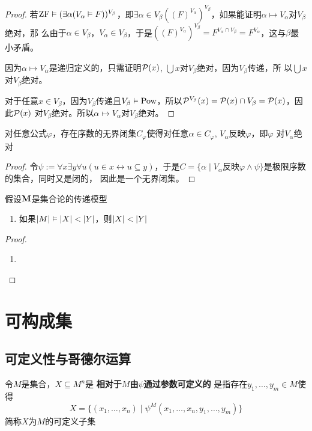 \documentclass[11pt]{article}
\begin{document}
\begin{proof}
若\(\operatorname{ZF}\vDash(\exists\alpha(V_\alpha\vDash F))^{V_\beta}\)，即\(\exists\alpha\in V_\beta((F)^{V_\alpha})^{V_\beta}\)，如果能证明\(\alpha\mapsto V_\alpha\)对\(V_\beta\)绝对，那
么由于\(\alpha\in V_\beta\)，\(V_\alpha\in V_\beta\)，于是\(((F)^{V_\alpha})^{V_\beta}=F^{V_\alpha\cap V_\beta}=F^{V_\alpha}\)，这与\(\beta\)最小矛盾。

因为\(\alpha\mapsto V_\alpha\)是递归定义的，只需证明\(\mathcal{P}(x)\), \(\bigcup x\)对\(V_\beta\)绝对，因为\(V_\beta\)传递，所
以\(\bigcup x\)对\(V_\beta\)绝对。

对于任意\(x\in V_\beta\)，因为\(V_\beta\)传递且\(V_\beta\vDash\operatorname{Pow}\)，所以\(\mathcal{P}^{V_\beta}(x)=\mathcal{P}(x)\cap V_\beta=\mathcal{P}(x)\)，因此\(\mathcal{P}(x)\)
对\(V_\beta\)绝对。所以\(\alpha\mapsto V_\alpha\)对\(V_\beta\)绝对。
\end{proof}

\begin{exercise}[7.10.18]
对任意公式\(\varphi\)，存在序数的无界闭集\(C_\varphi\)使得对任意\(\alpha\in C_\varphi\), \(V_\alpha\)反映\(\varphi\)，即\(\varphi\)
对\(V_\alpha\)绝对
\end{exercise}

\begin{proof}
令\(\psi:=\forall x\exists y\forall u(u\in x\leftrightarrow u\subseteq y)\)，于是\(C=\{\alpha\mid V_\alpha\text{反映}\varphi\wedge\psi\}\)是极限序数的集合，同时又是闭的，
因此是一个无界闭集。
\end{proof}

\begin{exercise}[3.10.19]
假设\(\operatorname{\textbf{M}}\)是集合论的传递模型
\begin{enumerate}
\item 如果\(\abs{M}\vDash\abs{X}<\abs{Y}\)，则\(\abs{X}<\abs{Y}\)
\end{enumerate}
\end{exercise}

\begin{proof}
\begin{enumerate}
\item 
\end{enumerate}
\end{proof}
\section{可构成集}
\label{sec:org3317ade}
\subsection{可定义性与哥德尔运算}
\label{sec:orgfae478b}
\begin{definition}[]
令\(M\)是集合，\(X\subseteq M^n\)是 \textbf{相对于\(M\)由\(\psi\)通过参数可定义的} 是指存在\(y_1,\dots,y_m\in M\)使得
\begin{equation*}
X=\{(x_1,\dots,x_n)\mid\psi^M(x_1,\dots,x_n,y_1,\dots,y_m)\}
\end{equation*}
简称\(X\)为\(M\)的可定义子集
\end{definition}
\end{document}
